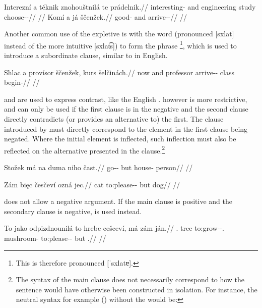 \pex
\a\begingl
    \gla Interezní a téknik znohouštnilá te prádelnik.//
    \glb interesting-\Att{} and engineering study  choose-\Pv{}-\Pf{}//
    \glft {}//
\endgl
\xe
\pex
\a\begingl
    \gla Komí a já ščenžek.//
    \glb good-\Att{} and  arrive-\Av{}-\Pf{}//
    \glft {}//
\endgl
\xe

Another common use of the expletive  is with the word  (pronounced [sxlat] instead of the more intuitive [sxlat͡s]) to form the phrase \footnote{This is therefore pronounced [ˈsxlatɐ].}, which is used to introduce a subordinate clause, similar to  in English.

\pex
\a\begingl
    \gla Shlac a provísor ščenžek, kurs šelčinách.//
    \glb now and professor arrive-\Av{}-\Pf{} class begin-//
    \glft {}//
\endgl
\xe


 and  are used to express contrast, like the English .  however is more restrictive, and can only be used if the first clause is in the negative and the second clause directly contradicts (or provides an alternative to) the first. The clause introduced by  must directly correspond to the element in the first clause being negated. Where the initial element is inflected, such inflection must also be reflected on the alternative presented in the  clause.\footnote{The syntax of the main clause does not necessarily correspond to how the sentence would have otherwise been constructed in isolation. For instance, the neutral syntax for example () without the  would be: }

\pex
\begingl
\gla Stožek má na duma niho čast.//
\glb go-\Av{}-\Pf{} but \Loc{} house-\Pat{}  person//
\glft {}//
\endgl
\xe


\pex[tag=ozna]
\begingl
\gla Zám bi\k{e}c česčeví ozná jec.//
\glb \Neg{} cat to:please-\Av{}-\Cont{} but dog//
\glft {}//
\endgl
\xe

 does not allow a negative argument. If the main clause is positive and the secondary clause is negative,  is used instead.

\pex[tag=ozna]
\begingl
\gla To jako odpizdnounil\'a to hrebe ce\v{s}cev\'i, m\'a z\'am j\'an.//
\glb \Dem{}.\Prox{} tree to:grow-\Loc{}-\Subj{}.\Ipf{} \Rz{} mushroom-\Pat{} to:please-\Av{}-\Cont{} but \Neg{} \Dem{}.\Med{}//
\glft {}//
\endgl
\xe


